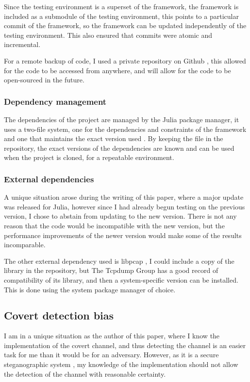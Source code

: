 Since the testing environment is a superset of the framework, the framework is included as a submodule of the testing environment, this points to a particular commit of the framework, so the framework can be updated independently of the testing environment. This also ensured that commits were atomic and incremental.

For a remote backup of code, I used a private repository on Github \citep{github}, this allowed for the code to be accessed from anywhere, and will allow for the code to be open-sourced in the future.

\subsubsection{Dependency management}

The dependencies of the project are managed by the Julia package manager, it uses a two-file system, one for the dependencies and constraints of the framework  and one that maintains the exact version used . By keeping the  file in the repository, the exact versions of the dependencies are known and can be used when the project is cloned, for a repeatable environment.

\subsubsection{External dependencies}

A unique situation arose during the writing of this paper, where a major update was released for Julia, however since I had already begun testing on the previous version, I chose to abstain from updating to the new version. There is not any reason that the code would be incompatible with the new version, but the performance improvements of the newer version would make some of the results incomparable.

The other external dependency used is libpcap \citep{libpcap}, I could include a copy of the library in the repository, but The Tcpdump Group has a good record of compatibility of its library, and then a system-specific version can be installed. This is done using the system package manager of choice. 

\subsection{Covert detection bias}

I am in a unique situation as the author of this paper, where I know the implementation of the covert channel, and thus detecting the channel is an easier task for me than it would be for an adversary. However, as it is a secure steganographic system \citep{SaW}, my knowledge of the implementation should not allow the detection of the channel with reasonable certainty.

